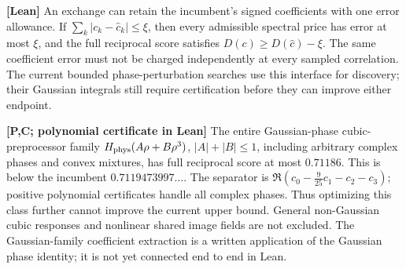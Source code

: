 \documentclass[11pt,a4paper]{article}
\begin{document}
\textbf{[Lean]} An exchange can retain the incumbent's signed coefficients with one error allowance.
If $\sum_k|c_k-\widehat c_k|\le\xi$, then every admissible spectral price has error at most $\xi$,
and the full reciprocal score satisfies $D(c)\ge D(\widehat c)-\xi$.
The same coefficient error must not be charged independently at every sampled correlation.
The current bounded phase-perturbation searches use this interface for discovery; their Gaussian
integrals still require certification before they can improve either endpoint.

\textbf{[P,C; polynomial certificate in Lean]} The entire Gaussian-phase cubic-preprocessor family
$H_{\rm phys}(A\rho+B\rho^3)$, $|A|+|B|\le1$, including arbitrary complex phases and convex mixtures,
has full reciprocal score at most $0.71186$. This is below the incumbent $0.7119473997\ldots$.
The separator is $\Re(c_0-\frac9{25}c_1-c_2-c_3)$; positive polynomial certificates handle all complex phases.
Thus optimizing this class further cannot improve the current upper bound. General non-Gaussian cubic
responses and nonlinear shared image fields are not excluded. The Gaussian-family coefficient extraction
is a written application of the Gaussian phase identity; it is not yet connected end to end in Lean.
\end{document}
